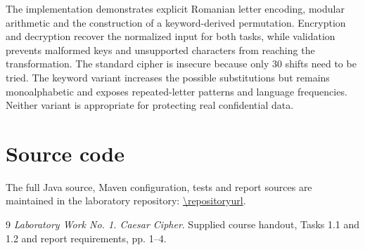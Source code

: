 \documentclass{utmreport}
\begin{document}
\utmconclusions
The implementation demonstrates explicit Romanian letter encoding, modular arithmetic and the construction of a keyword-derived permutation. Encryption and decryption recover the normalized input for both tasks, while validation prevents malformed keys and unsupported characters from reaching the transformation. The standard cipher is insecure because only 30 shifts need to be tried. The keyword variant increases the possible substitutions but remains monoalphabetic and exposes repeated-letter patterns and language frequencies. Neither variant is appropriate for protecting real confidential data.

\chapter*{Source code}
The full Java source, Maven configuration, tests and report sources are maintained in the laboratory repository: \url{\repositoryurl}.
\begin{thebibliography}{9}
 \textit{Laboratory Work No. 1. Caesar Cipher}. Supplied course handout, Tasks 1.1 and 1.2 and report requirements, pp. 1--4.
\end{thebibliography}
\end{document}
